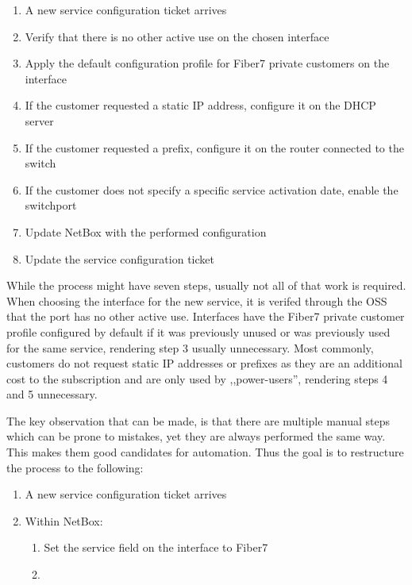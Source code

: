 \begin{enumerate}
  \item A new service configuration ticket arrives
  \item Verify that there is no other active use on the chosen interface
  \item Apply the default configuration profile for Fiber7 private customers on the interface
  \item If the customer requested a static IP address, configure it on the DHCP server
  \item If the customer requested a prefix, configure it on the router connected to the switch
  \item If the customer does not specify a specific service activation date, enable the switchport
  \item Update NetBox with the performed configuration
  \item Update the service configuration ticket
\end{enumerate}

While the process might have seven steps, usually not all of that work is required.
When choosing the interface for the new service, it is verifed through the \acrshort{OSS}
that the port has no other active use.
Interfaces have the Fiber7 private customer profile configured by default
if it was previously unused or was previously used for the same service,
rendering step 3 usually unnecessary.
Most commonly, customers do not request static IP addresses or prefixes as
they are an additional cost to the subscription and are only used by ,,power-users'',
rendering steps 4 and 5 unnecessary.

The key observation that can be made, is that there are multiple manual steps
which can be prone to mistakes, yet they are always performed the same way. This makes
them good candidates for automation. Thus the goal is to restructure the process
to the following:

\begin{enumerate}
  \item A new service configuration ticket arrives
  \item Within NetBox:
  \begin{enumerate}
    \item Set the service field on the interface to Fiber7
    \item 
  \end{enumerate}
\end{enumerate}


